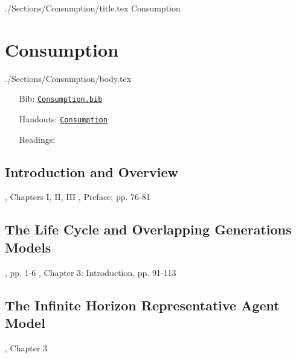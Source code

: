 \documentclass{\econtex}\newcommand{\texname}{Syllabus}
\begin{document}
\begin{verbatimwrite}{./Sections/Consumption/title.tex}
Consumption
\end{verbatimwrite}

\section{Consumption}\label{sec:consumption}
\begin{verbatimwrite}{./Sections/Consumption/body.tex}

\begin{itemize}
\item[Bib:] \texttt{\href{http://www.econ2.jhu.edu/people/ccarroll/courses/Choice/Syllabus/Consumption.bib}{Consumption.bib}}
\item[Handouts:] \texttt{\href{http://www.econ2.jhu.edu/people/ccarroll/courses/Choice/LectureNotes/Consumption/}{Consumption}}
\item[Readings:]
\end{itemize}

\newcommand{\IntroC}{Introduction and Overview}
\subsection{\IntroC}\label{subsec:\IntroC}

\newcommand{\dt}{\cite{deatonUnderstandingC}}
\newcommand{\fr}{\cite{friedmanATheory}}
\bi
\reqd \fr, Chapters I, II, III
\reqd \dt, Preface; pp. 76-81
\ei

\subsection{The Life Cycle and Overlapping Generations Models}

\providecommand{\blf}{\cite{blanchard&fischer:text}}
\providecommand{\ro}{\cite{romer:text}}
\bi
\reqd \dt, pp. 1-6
\reqd \blf, Chapter 3: Introduction, pp. 91-113
\recm \cite{diamond:olg}
\recm \cite{feldstein:induced}
\reqd \cite{modigliani:nobel}
\recm \cite{summersCapTax}
\recm \cite{pemberton:failure}
\reqd \cite{carroll&summers:cparallelsy}
\ei

\subsection{The Infinite Horizon Representative Agent Model}

\bi
\reqd \dt, Chapter 3
\reqd \cite{hallRandomWalk}
\recm \cite{flavinSensitive}
\recm \cite{cdSmooth}
\reqd \cite{cmModel}
\recm \cite{hallSubstitution}
\recm \cite{cfwSentiment}
\ei


\end{verbatimwrite}
\end{document}
